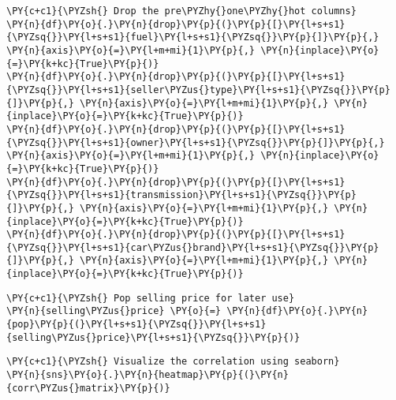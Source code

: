 \begin{tcolorbox}[breakable, size=fbox, boxrule=1pt, pad at break*=1mm,colback=cellbackground, colframe=cellborder]
\begin{Verbatim}[commandchars=\\\{\}]
\PY{c+c1}{\PYZsh{} Drop the pre\PYZhy{}one\PYZhy{}hot columns}
\PY{n}{df}\PY{o}{.}\PY{n}{drop}\PY{p}{(}\PY{p}{[}\PY{l+s+s1}{\PYZsq{}}\PY{l+s+s1}{fuel}\PY{l+s+s1}{\PYZsq{}}\PY{p}{]}\PY{p}{,} \PY{n}{axis}\PY{o}{=}\PY{l+m+mi}{1}\PY{p}{,} \PY{n}{inplace}\PY{o}{=}\PY{k+kc}{True}\PY{p}{)}
\PY{n}{df}\PY{o}{.}\PY{n}{drop}\PY{p}{(}\PY{p}{[}\PY{l+s+s1}{\PYZsq{}}\PY{l+s+s1}{seller\PYZus{}type}\PY{l+s+s1}{\PYZsq{}}\PY{p}{]}\PY{p}{,} \PY{n}{axis}\PY{o}{=}\PY{l+m+mi}{1}\PY{p}{,} \PY{n}{inplace}\PY{o}{=}\PY{k+kc}{True}\PY{p}{)}
\PY{n}{df}\PY{o}{.}\PY{n}{drop}\PY{p}{(}\PY{p}{[}\PY{l+s+s1}{\PYZsq{}}\PY{l+s+s1}{owner}\PY{l+s+s1}{\PYZsq{}}\PY{p}{]}\PY{p}{,} \PY{n}{axis}\PY{o}{=}\PY{l+m+mi}{1}\PY{p}{,} \PY{n}{inplace}\PY{o}{=}\PY{k+kc}{True}\PY{p}{)}
\PY{n}{df}\PY{o}{.}\PY{n}{drop}\PY{p}{(}\PY{p}{[}\PY{l+s+s1}{\PYZsq{}}\PY{l+s+s1}{transmission}\PY{l+s+s1}{\PYZsq{}}\PY{p}{]}\PY{p}{,} \PY{n}{axis}\PY{o}{=}\PY{l+m+mi}{1}\PY{p}{,} \PY{n}{inplace}\PY{o}{=}\PY{k+kc}{True}\PY{p}{)}
\PY{n}{df}\PY{o}{.}\PY{n}{drop}\PY{p}{(}\PY{p}{[}\PY{l+s+s1}{\PYZsq{}}\PY{l+s+s1}{car\PYZus{}brand}\PY{l+s+s1}{\PYZsq{}}\PY{p}{]}\PY{p}{,} \PY{n}{axis}\PY{o}{=}\PY{l+m+mi}{1}\PY{p}{,} \PY{n}{inplace}\PY{o}{=}\PY{k+kc}{True}\PY{p}{)}
\end{Verbatim}
\end{tcolorbox}

 \lipsum[1-1]
        
\begin{tcolorbox}[breakable, size=fbox, boxrule=1pt, pad at break*=1mm,colback=cellbackground, colframe=cellborder]
\begin{Verbatim}[commandchars=\\\{\}]
\PY{c+c1}{\PYZsh{} Pop selling price for later use}
\PY{n}{selling\PYZus{}price} \PY{o}{=} \PY{n}{df}\PY{o}{.}\PY{n}{pop}\PY{p}{(}\PY{l+s+s1}{\PYZsq{}}\PY{l+s+s1}{selling\PYZus{}price}\PY{l+s+s1}{\PYZsq{}}\PY{p}{)}
\end{Verbatim}
\end{tcolorbox}
\newpage

\begin{tcolorbox}[breakable, size=fbox, boxrule=1pt, pad at break*=1mm,colback=cellbackground, colframe=cellborder]
\begin{Verbatim}[commandchars=\\\{\}]
\PY{c+c1}{\PYZsh{} Visualize the correlation using seaborn}
\PY{n}{sns}\PY{o}{.}\PY{n}{heatmap}\PY{p}{(}\PY{n}{corr\PYZus{}matrix}\PY{p}{)}
\end{Verbatim}
\end{tcolorbox}

